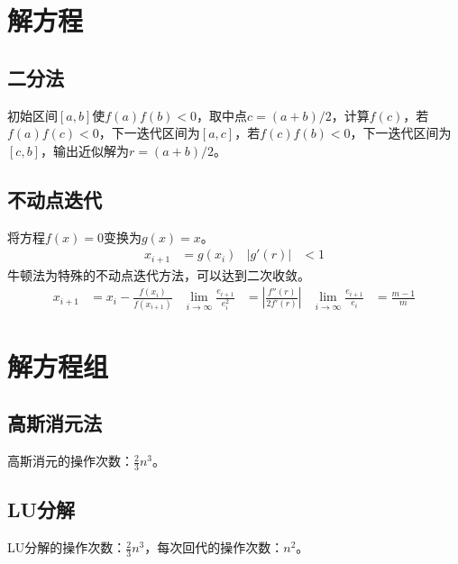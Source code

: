 \documentclass[twocolumn]{article}
\begin{document}
\section{解方程}

\subsection{二分法}
初始区间$[a,b]$使$f(a)f(b)<0$，取中点$c=(a+b)/2$，计算$f(c)$，若$f(a)f(c)<0$，下一迭代区间为$[a,c]$，若$f(c)f(b)<0$，下一迭代区间为$[c,b]$，输出近似解为$r=(a+b)/2$。

\subsection{不动点迭代}
将方程$f(x)=0$变换为$g(x)=x$。
\begin{align*}
    x_{i+1} & =g(x_i) & |g'(r)| & <1
\end{align*}
牛顿法为特殊的不动点迭代方法，可以达到二次收敛。
\begin{align*}
    x_{i+1} & =x_i-\frac{f(x_i)}{f(x_{i+1})} & \lim_{i\rightarrow \infty}\frac{e_{i+1}}{e_i^2} & =\left| \frac{f''(r)}{2f'(r)} \right| & \lim_{i\rightarrow \infty}\frac{e_{i+1}}{e_i} & =\frac{m-1}{m}
\end{align*}

\section{解方程组}

\subsection{高斯消元法}
高斯消元的操作次数：$\frac{2}{3}n^3$。

\subsection{LU分解}
LU分解的操作次数：$\frac{2}{3}n^3$，每次回代的操作次数：$n^2$。
\end{document}

